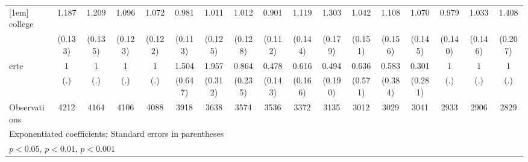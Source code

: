{\begin{tabular}{l*{16}{c}}
[1em]
college             &       1.187         &       1.209         &       1.096         &       1.072         &       0.981         &       1.011         &       1.012         &       0.901         &       1.119         &       1.303         &       1.042         &       1.108         &       1.070         &       0.979         &       1.033         &       1.408\sym{*}  \\
                    &     (0.133)         &     (0.135)         &     (0.123)         &     (0.122)         &     (0.113)         &     (0.125)         &     (0.128)         &     (0.112)         &     (0.144)         &     (0.179)         &     (0.151)         &     (0.156)         &     (0.145)         &     (0.140)         &     (0.146)         &     (0.207)         \\
[1em]
erte                &           1         &           1         &           1         &           1         &       1.504         &       1.957\sym{***}&       0.864         &       0.478\sym{*}  &       0.616         &       0.494         &       0.636         &       0.583         &       0.301         &           1         &           1         &           1         \\
                    &         (.)         &         (.)         &         (.)         &         (.)         &     (0.647)         &     (0.312)         &     (0.235)         &     (0.143)         &     (0.166)         &     (0.190)         &     (0.571)         &     (0.384)         &     (0.281)         &         (.)         &         (.)         &         (.)         \\
\hline
Observations        &        4212         &        4164         &        4106         &        4088         &        3918         &        3638         &        3574         &        3536         &        3372         &        3135         &        3012         &        3029         &        3041         &        2933         &        2906         &        2829         \\
\hline\hline
\multicolumn{17}{l}{\footnotesize Exponentiated coefficients; Standard errors in parentheses}\\
\multicolumn{17}{l}{\footnotesize \sym{*} \(p<0.05\), \sym{**} \(p<0.01\), \sym{***} \(p<0.001\)}\\
\end{tabular}
}
